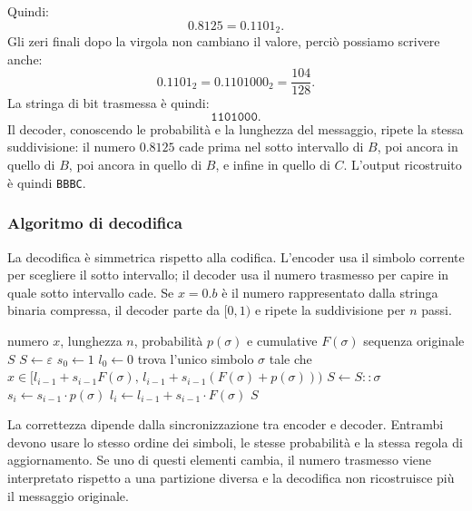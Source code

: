 \documentclass{article}
\theoremstyle{definition}
\numberwithin{equation}{section}
\begin{document}
Quindi:
\[
    0.8125=0.1101_2.
\]
Gli zeri finali dopo la virgola non cambiano il valore, perciò possiamo scrivere anche:
\[
    0.1101_2
    =
    0.1101000_2
    =
    \frac{104}{128}.
\]
La stringa di bit trasmessa è quindi:
\[
    \texttt{1101000}.
\]
Il decoder, conoscendo le probabilità e la lunghezza del messaggio, ripete la stessa suddivisione: il numero $0.8125$ cade prima nel sotto intervallo di $B$, poi ancora in quello di $B$, poi ancora in quello di $B$, e infine in quello di $C$. L'output ricostruito è quindi \texttt{BBBC}.

\subsubsection{Algoritmo di decodifica}
La decodifica è simmetrica rispetto alla codifica. L'encoder usa il simbolo corrente per scegliere il sotto intervallo; il decoder usa il numero trasmesso per capire in quale sotto intervallo cade. Se $x=0.b$ è il numero rappresentato dalla stringa binaria compressa, il decoder parte da $[0,1)$ e ripete la suddivisione per $n$ passi.

\begin{algorithm}[htpb]
    \caption{Decodifica aritmetica statica}
    \label{alg:arithmetic_decoding}
    \begin{algorithmic}[1]
        \Require numero $x$, lunghezza $n$, probabilità $p(\sigma)$ e cumulative $F(\sigma)$
        \Ensure sequenza originale $S$
        \State $S \gets \varepsilon$
        \State $s_0 \gets 1$
        \State $l_0 \gets 0$
        \State trova l'unico simbolo $\sigma$ tale che $x\in[l_{i-1}+s_{i-1}F(\sigma),\,l_{i-1}+s_{i-1}(F(\sigma)+p(\sigma)))$
        \State $S \gets S::\sigma$
        \State $s_i \gets s_{i-1}\cdot p(\sigma)$
        \State $l_i \gets l_{i-1}+s_{i-1}\cdot F(\sigma)$
        \EndFor
        \State \Return $S$
    \end{algorithmic}
\end{algorithm}

La correttezza dipende dalla sincronizzazione tra encoder e decoder. Entrambi devono usare lo stesso ordine dei simboli, le stesse probabilità e la stessa regola di aggiornamento. Se uno di questi elementi cambia, il numero trasmesso viene interpretato rispetto a una partizione diversa e la decodifica non ricostruisce più il messaggio originale.
\end{document}
